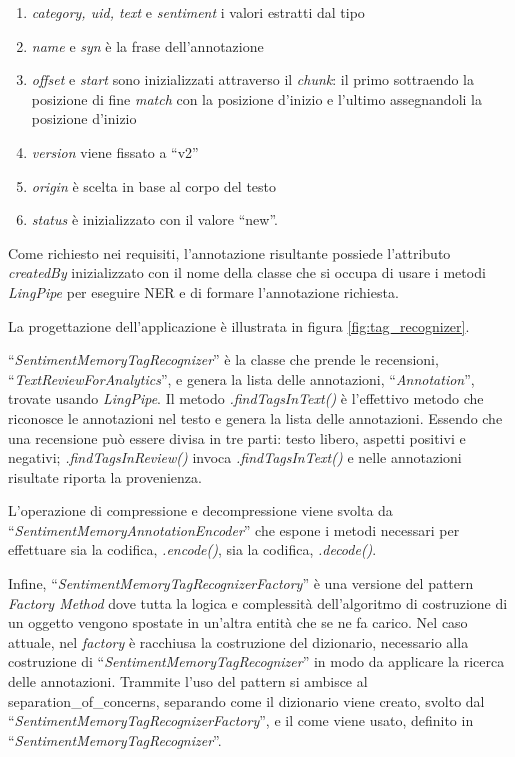 \begin{enumerate}
\item \textit{category, uid, text} e \textit{sentiment} i valori estratti dal
tipo
\item \textit{name} e \textit{syn} è la frase dell'annotazione
\item \textit{offset} e \textit{start} sono inizializzati attraverso il
\textit{chunk}: il primo sottraendo la posizione di fine \textit{match} con la
posizione d'inizio e l'ultimo assegnandoli la posizione d'inizio
\item \textit{version} viene fissato a ``v2''
\item \textit{origin} è scelta in base al corpo del testo
\item \textit{status} è inizializzato con il valore ``new''.
\end{enumerate}

Come richiesto nei requisiti, l'annotazione risultante possiede l'attributo
\textit{createdBy} inizializzato con il nome della classe che si occupa di
usare i metodi \textit{LingPipe} per eseguire \gls{NER} e di formare
l'annotazione richiesta.

La progettazione dell'applicazione è illustrata in figura
\ref{fig:tag_recognizer}.

``\textit{SentimentMemoryTagRecognizer}'' è la classe che prende le recensioni,
``\textit{TextReviewForAnalytics}'', e genera la lista delle annotazioni,
``\textit{Annotation}'', trovate usando \textit{LingPipe}. Il metodo
\textit{.findTagsInText()} è l'effettivo metodo che riconosce le annotazioni nel
testo e genera la lista delle annotazioni. Essendo che una recensione può essere
divisa in tre parti: testo libero, aspetti positivi e negativi;
\textit{.findTagsInReview()} invoca \textit{.findTagsInText()} e nelle
annotazioni risultate riporta la provenienza.

L'operazione di compressione e decompressione viene svolta da
``\textit{SentimentMemoryAnnotationEncoder}'' che espone i metodi necessari per
effettuare sia la codifica, \textit{.encode()}, sia la codifica,
\textit{.decode()}.

Infine, ``\textit{SentimentMemoryTagRecognizerFactory}'' è una versione del
pattern \textit{Factory Method} dove tutta la logica e complessità
dell'algoritmo di costruzione di un oggetto vengono spostate in un'altra entità
che se ne fa carico. Nel caso attuale, nel \textit{factory} è racchiusa la
costruzione del dizionario, necessario alla costruzione di
``\textit{SentimentMemoryTagRecognizer}'' in modo da applicare la ricerca delle
annotazioni. Trammite l'uso del pattern si ambisce al
\gls{separation_of_concerns}, separando come il dizionario viene creato, svolto
dal ``\textit{SentimentMemoryTagRecognizerFactory}'', e il come viene usato,
definito in ``\textit{SentimentMemoryTagRecognizer}''.

